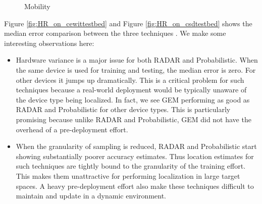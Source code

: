 \documentclass{Localization-PaperWriteupDraft}
\begin{document}
\begin{figure}
	\centering
	\caption{Mobility}
	\label{fig:mobility}
\end{figure}


Figure \ref{fig:HR_on_cewittestbed} and Figure \ref{fig:HR_on_csdtestbed} shows the median error comparison between the three techniques . We make some interesting observations here:
 
\begin{itemize}

\item Hardware variance is a major issue for both RADAR and Probabilistic. When the same device is used for training and testing, the median error is zero. For other devices it jumps up dramatically. This is a critical problem for such techniques because a real-world deployment would be typically unaware of the device type being localized. In fact, we see GEM performing as good as RADAR and Probabilistic for other device types. This is particularly promising because unlike RADAR and Probabilistic, GEM did not have the overhead of a pre-deployment effort.

\item When the granularity of sampling is reduced, RADAR and Probabilistic start showing substantially poorer accuracy estimates. Thus location estimates for such techniques are tightly bound to the granularity of the training effort. This makes them unattractive for performing localization in large target spaces. A heavy pre-deployment effort also make these techniques difficult to maintain and  update in a dynamic environment.

\end{itemize}
\end{document}
